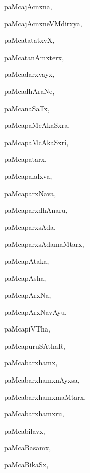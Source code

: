 \begin{multicols}{3}
{\noindent
{paMcajAcnxna}, \pageref{paMcajAcnxna}

\noindent
{paMcajAcnxneVMdirxya}, \pageref{paMcajAcnxneVMdirxya}

\noindent
{paMcatatatxvX}, \pageref{paMcatatatxvX}

\noindent
{paMcatanAmxterx}, \pageref{paMcatanAmxterx}

\noindent
{paMcadarxvayx}, \pageref{paMcadarxvayx}

\noindent
{paMcadhAraNe}, \pageref{paMcadhAraNe}

\noindent
{paMcanaSaTx}, \pageref{paMcanaSaTx}

\noindent
{paMcapaMcAkaSxra}, \pageref{paMcapaMcAkaSxra}

\noindent
{paMcapaMcAkaSxri}, \pageref{paMcapaMcAkaSxri}

\noindent
{paMcapatarx}, \pageref{paMcapatarx}

\noindent
{paMcapalalxva}, \pageref{paMcapalalxva}

\noindent
{paMcaparxNava}, \pageref{paMcaparxNava}

\noindent
{paMcaparxdhAnaru}, \pageref{paMcaparxdhAnaru}

\noindent
{paMcaparxsAda}, \pageref{paMcaparxsAda}

\noindent
{paMcaparxsAdamaMtarx}, \pageref{paMcaparxsAdamaMtarx}

\noindent
{paMcapAtaka}, \pageref{paMcapAtaka}

\noindent
{paMcapAsha}, \pageref{paMcapAsha}

\noindent
{paMcapArxNa}, \pageref{paMcapArxNa}

\noindent
{paMcapArxNavAyu}, \pageref{paMcapArxNavAyu}

\noindent
{paMcapiVTha}, \pageref{paMcapiVTha}

\noindent
{paMcapuruSAthaR}, \pageref{paMcapuruSAthaR}

\noindent
{paMcabarxhamx}, \pageref{paMcabarxhamx}

\noindent
{paMcabarxhamxnAyxsa}, \pageref{paMcabarxhamxnAyxsa}

\noindent
{paMcabarxhamxmaMtarx}, \pageref{paMcabarxhamxmaMtarx}

\noindent
{paMcabarxhamxru}, \pageref{paMcabarxhamxru}

\noindent
{paMcabilavx}, \pageref{paMcabilavx}

\noindent
{paMcaBasamx}, \pageref{paMcaBasamx}

\noindent
{paMcaBikaSx}, \pageref{paMcaBikaSx}

}
\end{multicols}
